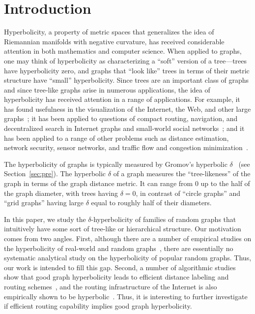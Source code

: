 \documentclass[11pt]{article}
\begin{document}
\section{Introduction}
\label{sxn:intro}

Hyperbolicity, a property of metric spaces that generalizes the idea of 
Riemannian manifolds with negative curvature, has received considerable
attention in both mathematics and computer science.
When applied to graphs, 
one may think of hyperbolicity as characterizing a ``soft'' version of a 
tree---trees have hyperbolicity zero, and graphs 
that ``look like'' trees in terms of their metric structure have ``small'' 
hyperbolicity.
Since trees are an important class of graphs and since tree-like graphs 
arise in numerous applications, the idea of hyperbolicity has received 
attention in a range of applications.
For example, it has found usefulness in the visualization of the Internet, 
the Web, and other large graphs~\cite{LR94,LRP95,MB95,Mun98,WR02};
it has been applied to questions of compact routing, navigation, and 
decentralized search in Internet graphs and small-world social 
networks~\cite{GL05,CDEHVX10,Kle07,ABKMRT07,KCFB07,BKC09,PKBV10};
and it has been applied to a range of other problems such as distance 
estimation, network security, sensor networks, and traffic flow and 
congestion minimization~\cite{Bar02,JL02,JL04,JLB08,NS11,montgolfier2011treewidth}.

The hyperbolicity of graphs is typically measured by Gromov's
	hyperbolic $\delta$~\cite{gromov1987hyperbolic,BH99}
	(see Section~\ref{sec:pre}).
The hyperbolic $\delta$ of a graph measures the ``tree-likeness'' of
	the graph in terms of the graph distance metric.
It can range from $0$ up to the half of the 
graph diameter, with trees having $\delta=0$, in contrast of ``circle graphs'' and 
``grid graphs'' having large $\delta$ equal to roughly half of their diameters.

In this paper, we study the $\delta$-hyperbolicity of 
	families of random graphs that intuitively 
	have some sort of tree-like or hierarchical structure.
Our motivation comes from two angles.
First, although there are a number of empirical studies on the hyperbolicity
	of real-world and random 
	graphs~\cite{Bar02,JL02,LouTH,LohsoonTH,NS11,montgolfier2011treewidth}, there are essentially no systematic analytical study on the
	hyperbolicity of popular random graphs.
Thus, our work is intended to fill this gap.
Second, a number of algorithmic studies show that good graph hyperbolicity
	leads to efficient distance labeling and routing 
	schemes~\cite{CD00,GL05,CE07,chepoi2008diameters,KPKVB10,CDEHVX10},
	and the routing infrastructure of the Internet is also empirically
	shown to be hyperbolic~\cite{Bar02}.
Thus, it is interesting to further investigate if efficient routing capability
	implies good graph hyperbolicity.
\end{document}

